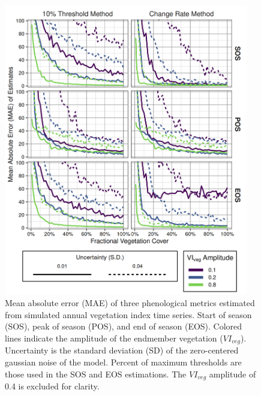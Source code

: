 \documentclass{article}
\begin{document}
\begin{figure}[h]
    \centering
    \includegraphics[width=0.95\textwidth]{figures/fig3_sim_mae.png}
    \caption{Mean absolute error (MAE) of three phenological metrics estimated from simulated annual vegetation index time series. Start of season (SOS), peak of season (POS), and end of season (EOS). Colored lines indicate the amplitude of the endmember vegetation ($VI_{veg}$). Uncertainty is the standard deviation (SD) of the zero-centered gaussian noise of the model. Percent of maximum thresholds are those used in the SOS and EOS estimations. The $VI_{veg}$  amplitude of 0.4 is excluded for clarity.}
    \label{fig3}
\end{figure}
\end{document}
